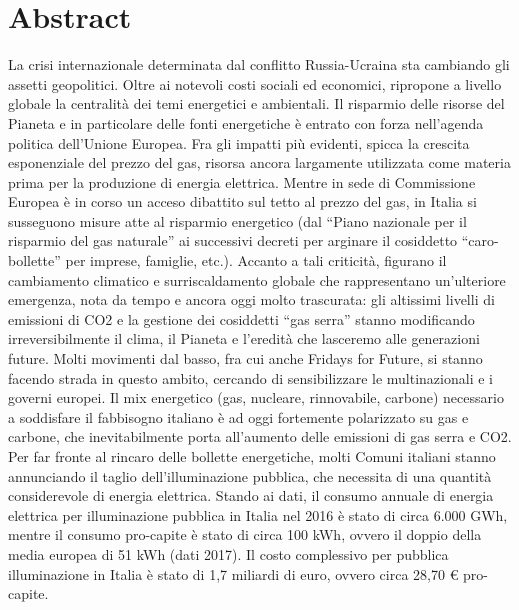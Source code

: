 \section{Abstract}

La crisi internazionale determinata dal conflitto Russia-Ucraina sta cambiando gli assetti geopolitici. Oltre ai notevoli costi sociali ed economici, ripropone a livello globale la centralità dei temi energetici e ambientali.
Il risparmio delle risorse del Pianeta e in particolare delle fonti energetiche è entrato con forza nell'agenda politica dell’Unione Europea. Fra gli impatti più evidenti, spicca la crescita esponenziale del prezzo del gas, risorsa ancora largamente utilizzata come materia prima per la produzione di energia elettrica. Mentre in sede di Commissione Europea è in corso un acceso dibattito sul tetto al prezzo del gas, in Italia si susseguono misure atte al risparmio energetico (dal “Piano nazionale per il risparmio del gas naturale” ai successivi decreti per arginare il cosiddetto “caro-bollette” per imprese, famiglie, etc.).
Accanto a tali criticità, figurano il cambiamento climatico e surriscaldamento globale che rappresentano un’ulteriore emergenza, nota da tempo e ancora oggi molto trascurata: gli altissimi livelli di emissioni di CO2 e la gestione dei cosiddetti “gas serra” stanno modificando irreversibilmente il clima, il Pianeta e l’eredità che lasceremo alle generazioni future. Molti movimenti dal basso, fra cui anche Fridays for Future, si stanno facendo strada in questo ambito, cercando di sensibilizzare le multinazionali e i governi europei. Il mix energetico (gas, nucleare, rinnovabile, carbone) necessario a soddisfare il fabbisogno italiano è ad oggi fortemente polarizzato su gas e carbone, che inevitabilmente porta all’aumento delle emissioni di gas serra e CO2.
Per far fronte al rincaro delle bollette energetiche, molti Comuni italiani stanno annunciando il taglio dell’illuminazione pubblica, che necessita di una quantità considerevole di energia elettrica. Stando ai dati, il consumo annuale di energia elettrica per illuminazione pubblica in Italia nel 2016 è stato di circa 6.000 GWh, mentre il consumo pro-capite è stato di circa 100 kWh, ovvero il doppio della media europea di 51 kWh (dati 2017). Il costo complessivo per pubblica illuminazione in Italia è stato di 1,7 miliardi di euro, ovvero circa 28,70 € pro-capite.